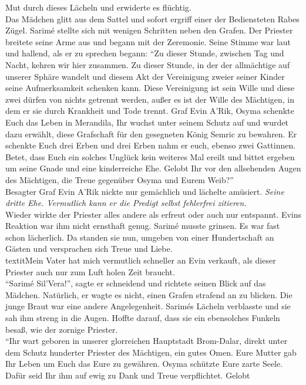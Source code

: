 Mut durch dieses Lächeln und erwiderte es flüchtig.\\ 
Das Mädchen glitt aus dem Sattel und sofort ergriff einer der Bediensteten Rabes Zügel. 
Sarimé stellte sich mit wenigen Schritten neben den Grafen. Der Priester breitete seine Arme aus und 
begann mit der Zeremonie. Seine Stimme war laut und hallend, als er zu sprechen begann: ``Zu dieser 
Stunde, zwischen Tag und Nacht, kehren wir hier zusammen. Zu dieser Stunde, in der der allmächtige 
auf unserer Sphäre wandelt und diesem Akt der Vereinigung zweier seiner Kinder seine Aufmerksamkeit 
schenken kann. Diese Vereinigung ist sein Wille und diese zwei dürfen von nichts getrennt werden, 
außer es ist der Wille des Mächtigen, in dem er sie durch Krankheit und Tode trennt. Graf Evin 
A’Rik, Osyma schenkte Euch das Leben in Merandila, Ihr wuchst unter seinem Schutz auf und wurdet 
dazu erwählt, diese Grafschaft für den gesegneten König Semric zu bewahren. Er schenkte Euch drei 
Erben und drei Erben nahm er euch, ebenso zwei Gattinnen. Betet, dass Euch ein solches Unglück kein 
weiteres Mal ereilt und bittet ergeben um seine Gnade und eine kinderreiche Ehe. Gelobt Ihr vor den 
allsehenden Augen des Mächtigen, die Treue gegenüber Osyma und Eurem Weib?''\\
Besagter Graf Evin A'Rik nickte nur gemächlich und lächelte amüsiert. \textit{Seine dritte Ehe. 
Vermutlich kann er die Predigt selbst fehlerfrei zitieren.}\\
Wieder wirkte der Priester alles andere als erfreut oder auch nur entspannt. Evins Reaktion war ihm 
nicht ernsthaft genug. Sarimé musste grinsen. Es war fast schon lächerlich. Da standen sie nun, 
umgeben von einer Hundertschaft an Gästen und versprachen sich Treue und Liebe.
\\textit{Mein Vater hat mich vermutlich schneller an Evin verkauft, als dieser Priester auch nur 
zum Luft holen Zeit braucht.}\\
``Sarimé Sil'Vera!'', sagte er schneidend und richtete seinen Blick auf das Mädchen.
Natürlich, er wagte es nicht, einen Grafen strafend an zu blicken. Die junge Braut war eine andere 
Angelegenheit. Sarimés Lächeln verblasste und sie sah ihm streng in die Augen. Hoffte darauf, dass 
sie ein ebensolches Funkeln besaß, wie der zornige Priester.\\
``Ihr wart geboren in unserer glorreichen Hauptstadt Brom-Dalar, direkt unter dem Schutz hunderter 
Priester des Mächtigen, ein gutes Omen. Eure Mutter gab Ihr Leben um Euch das Eure zu gewähren. 
Osyma schützte Eure zarte Seele. Dafür seid Ihr ihm auf ewig zu Dank und Treue verpflichtet. Gelobt 

